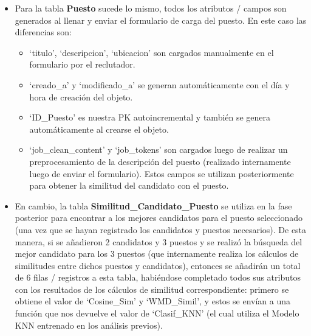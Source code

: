 \documentclass[12pt,a4paper]{article}
\begin{document}
\begin{sloppypar}
\begin{itemize}
\item Para la tabla \textbf{Puesto} sucede lo mismo, todos los atributos / campos son generados al llenar y enviar el formulario de carga del puesto. En este caso las diferencias son:

\begin{itemize}
\item ‘titulo’, ‘descripcion’, ‘ubicacion’ son cargados manualmente en el formulario por el reclutador.
\item ‘creado\_a’ y ‘modificado\_a’ se generan automáticamente con el día y hora de creación del objeto.
\item ‘ID\_Puesto’ es nuestra PK autoincremental y también se genera automáticamente al crearse el objeto. 
\item ‘job\_clean\_content’ y ‘job\_tokens’ son cargados luego de realizar un preprocesamiento de la descripción del puesto (realizado internamente luego de enviar el formulario). Estos campos se utilizan posteriormente para obtener la similitud del candidato con el puesto. 
\end{itemize}

\item En cambio, la tabla \textbf{Similitud\_Candidato\_Puesto} se utiliza en la fase posterior para encontrar a los mejores candidatos para el puesto seleccionado (una vez que se hayan registrado los candidatos y puestos necesarios). De esta manera, si se añadieron 2 candidatos y 3 puestos y se realizó la búsqueda del mejor candidato para los 3 puestos (que internamente realiza los cálculos de similitudes entre dichos puestos y candidatos), entonces se añadirán un total de 6 filas / registros a esta tabla, habiéndose completado todos sus atributos con los resultados de los cálculos de similitud correspondiente: primero se obtiene el valor de ‘Cosine\_Sim’ y ‘WMD\_Simil’, y estos se envían a una función que nos devuelve el valor de ‘Clasif\_KNN’ (el cual utiliza el Modelo KNN entrenado en los análisis previos). 

\end{itemize}

\cleardoublepage


\end{sloppypar}
\end{document}
